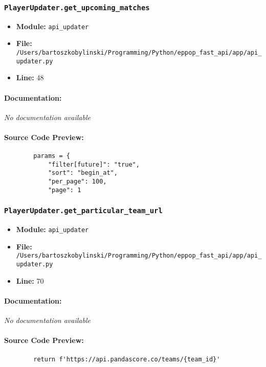 \documentclass[11pt,a4paper]{article}
\begin{document}
\subsubsection{\texttt{PlayerUpdater.get\_upcoming\_matches}}

\begin{itemize}
    \item \textbf{Module:} \texttt{api\_updater}
    \item \textbf{File:} \texttt{/Users/bartoszkobylinski/Programming/Python/eppop\_fast\_api/app/api\_updater.py}
    \item \textbf{Line:} 48
\end{itemize}

\paragraph{Documentation:} \textit{No documentation available}

\paragraph{Source Code Preview:}
\begin{verbatim}
        params = {
            "filter[future]": "true",
            "sort": "begin_at",
            "per_page": 100,
            "page": 1
\end{verbatim}

\vspace{1em}
\subsubsection{\texttt{PlayerUpdater.get\_particular\_team\_url}}

\begin{itemize}
    \item \textbf{Module:} \texttt{api\_updater}
    \item \textbf{File:} \texttt{/Users/bartoszkobylinski/Programming/Python/eppop\_fast\_api/app/api\_updater.py}
    \item \textbf{Line:} 70
\end{itemize}

\paragraph{Documentation:} \textit{No documentation available}

\paragraph{Source Code Preview:}
\begin{verbatim}
        return f'https://api.pandascore.co/teams/{team_id}'
\end{verbatim}
\end{document}
